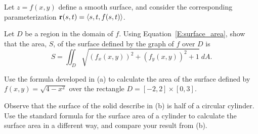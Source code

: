 \begin{activity} \label{A:11.6.6} Let $z = f(x,y)$ define a smooth surface, and consider the corresponding parameterization $\mathbf{r}(s,t) = \langle s, t, f(s,t) \rangle$.
    \ba
    \item Let $D$ be a region in the domain of $f$.  Using Equation~\ref{E:surface_area}, show that the area, $S$, of the surface defined by the graph of $f$ over $D$ is
\[S = \iint_D \sqrt{\left(f_x(x,y)\right)^2 + \left(f_y(x,y)\right)^2 + 1} \ dA.\]

    \item Use the formula developed in (a) to calculate the area of the surface defined by $f(x,y) = \sqrt{4-x^2}$ over the rectangle $D = [-2,2] \times [0,3]$. 

    \item Observe that the surface of the solid describe in (b) is half of a circular cylinder.  Use the standard formula for the surface area of a cylinder to calculate the surface area in a different way, and compare your result from (b).

\ea

\end{activity}
\begin{smallhint}

\end{smallhint}
\begin{bighint}

\end{bighint}
